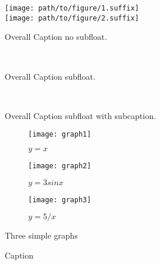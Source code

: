 \begin{figure}[ht]
    \center
    \texttt{[image: path/to/figure/1.suffix]}\\
    \texttt{[image: path/to/figure/2.suffix]}
    \caption{Overall Caption no subfloat.}
\label{fig:no_subfloat}
\end{figure}

\begin{figure}[ht]
    \center
    \\
    \caption{Overall Caption subfloat.}
\label{fig:subfloat}
\end{figure}

\begin{figure}[ht]
    \center
    \\
    \caption{Overall Caption subfloat with subcaption.}
\label{fig:subfloat_subcaption}
\end{figure}

\begin{figure}
    \centering
    \begin{subfigure}[b]{0.3\textwidth}
        \centering
        \texttt{[image: graph1]}
        \caption{$y=x$}
        \label{fig:y equals x}
    \end{subfigure}
    \hfill
    \begin{subfigure}[b]{0.3\textwidth}
        \centering
        \texttt{[image: graph2]}
        \caption{$y=3sinx$}
        \label{fig:three sin x}
    \end{subfigure}
    \hfill
    \begin{subfigure}[b]{0.3\textwidth}
        \centering
        \texttt{[image: graph3]}
        \caption{$y=5/x$}
        \label{fig:five over x}
    \end{subfigure}
       \caption{Three simple graphs}
       \label{fig:three graphs}
\end{figure}


\begin{figure}
    \centering
    \hfill
    \hfill
    \hfill
    \caption{Caption}
\end{figure}

